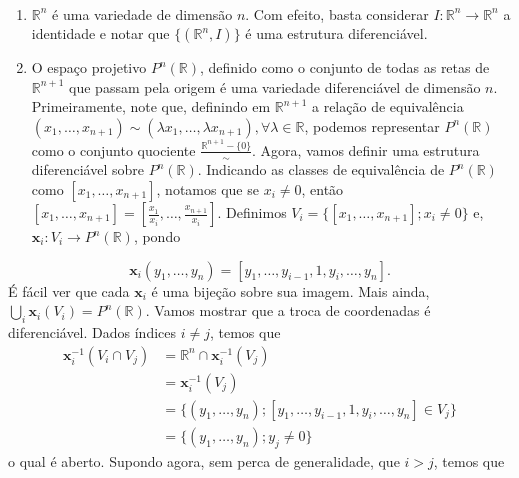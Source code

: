 	\begin{examples}
		\label{ex:variedades-diferenciaveis}
		$ $
		\begin{enumerate}
			\item $\mathbb{R}^{n}$ é uma variedade de dimensão $n$. Com efeito, basta considerar $I:\mathbb{R}^{n}\to \mathbb{R}^{n}$ a identidade e notar que $\{ (\mathbb{R}^{n}, I) \}$ é uma estrutura diferenciável.
			\item  O espaço projetivo $P^{n}(\mathbb{R})$, definido como o conjunto de todas as retas de $\mathbb{R}^{n+1}$ que passam pela origem é uma variedade diferenciável de dimensão $n$. Primeiramente, note que, definindo em $\mathbb{R}^{n+1}$ a relação de equivalência $(x_{1}, \dots, x_{n+1}) \sim (\lambda x_{1}, \dots, \lambda x_{n+1}), \forall \lambda \in \mathbb{R}$, podemos representar $P^{n}(\mathbb{R})$ como o conjunto quociente $\frac{\mathbb{R}^{n+1}-\{ 0 \}}{\sim}$. Agora, vamos definir uma estrutura diferenciável sobre $P^{n}(\mathbb{R})$. Indicando as classes de equivalência de $P^{n}(\mathbb{R})$ como $[x_{1}, \dots, x_{n+1}]$, notamos que se $x_{i}\neq{0}$, então $[x_{1}, \dots, x_{n+1}]=\left[ \frac{x_{1}}{x_{i}}, \dots, \frac{x_{n+1}}{x_{i}} \right]$. Definimos $V_{i}=\{ [x_{1}, \dots, x_{n+1}]; x_{i}\neq 0 \}$ e, $\mathbf{x}_{i}:V_{i}\to P^{n}(\mathbb{R})$, pondo
		\end{enumerate}
		\begin{equation*}
			\mathbf{x}_{i}(y_{1}, \dots, y_{n})=[y_{1}, \dots, y_{i-1}, 1, y_{i}, \dots, y_{n}].
		\end{equation*}
		É fácil ver que cada $\mathbf{x}_{i}$ é uma bijeção sobre sua imagem. Mais ainda, $\displaystyle \bigcup_{i}\mathbf{x}_{i}(V_{i})=P^{n}(\mathbb{R})$. Vamos mostrar que a troca de coordenadas é diferenciável. Dados índices $i \neq j$, temos que
		\begin{align*}
			\mathbf{x}_{i}^{-1}(V_{i}\cap V_{j}) & =\mathbb{R}^{n}\cap \mathbf{x}_{i}^{-1}(V_{j})                                           \\
			                                     & = \mathbf{x}_{i}^{-1}(V_{j})                                                             \\
			                                     & = \{ (y_{1}, \dots, y_{n}); [y_{1}, \dots, y_{i-1}, 1, y_{i}, \dots, y_{n}] \in V_{j} \} \\
			                                     & = \{ (y_{1}, \dots, y_{n});y_{j} \neq 0 \}
		\end{align*}
		o qual é aberto.
		Supondo agora, sem perca de generalidade, que $i>j$, temos que

\end{examples}
